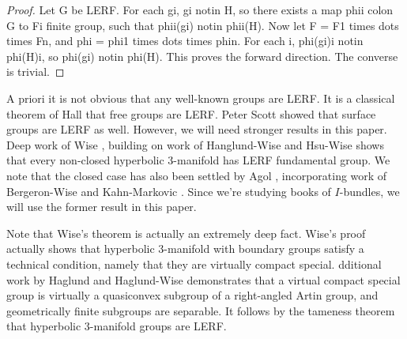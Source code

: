 \begin{proof}

Let G be LERF. For each gi, gi notin H, so there exists a map phii colon G to
Fi finite group, such that phii(gi) notin phii(H). Now let F = F1 times dots
times Fn, and phi = phi1 times dots times phin. For each i, phi(gi)i notin
phi(H)i, so phi(gi) notin phi(H). This proves the forward direction.  The
converse is trivial.

\end{proof}



A priori it is not obvious that any well-known groups are LERF. It is
a classical theorem of Hall \cite{Hall} that free groups are LERF. Peter Scott
\cite{Scott} showed that surface groups are LERF as well. However, we will need
stronger results in this paper. Deep work of Wise \cite{Wise}, building on work
of Hanglund-Wise \cite{HaglundWise} and Hsu-Wise \cite{HsuWise} shows that
every non-closed hyperbolic 3-manifold has LERF fundamental group. We note that
the closed case has also been settled by Agol \cite{Agol}, incorporating work
of Bergeron-Wise \cite{BergeronWise} and Kahn-Markovic \cite{KM}. Since we're
studying books of $I$-bundles, we will use the former result in this paper.

Note that Wise's theorem is actually an extremely deep fact. Wise's proof
actually shows that hyperbolic 3-manifold with boundary groups satisfy
a technical condition, namely that they are virtually compact special.
dditional work by Haglund and Haglund-Wise demonstrates that a virtual compact
special group is virtually a quasiconvex subgroup of a right-angled Artin
group, and geometrically finite subgroups are separable.  It follows by the
tameness theorem that hyperbolic 3-manifold groups are LERF.

%
%

